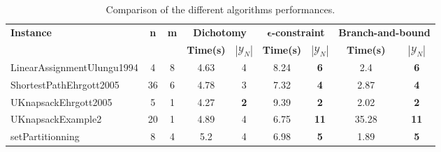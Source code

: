 \begin{table}[!h]
\centering
\hspace*{-1cm}\begin{tabular}{lcccccccc}
\toprule
\textbf{Instance} & \textbf{n} & \textbf{m} & \multicolumn{2}{c}{\textbf{Dichotomy}} & \multicolumn{2}{c}{\textbf{$\mathbf{\epsilon}$-constraint}}  & \multicolumn{2}{c}{\textbf{Branch-and-bound}}
\\
\cmidrule(r){4-5} \cmidrule(r){6-7} \cmidrule(r){8-9}
~ & ~ & ~ & \textbf{Time(s)} & \textbf{$|\mathcal{Y}_N|$} & \textbf{Time(s)} & \textbf{$|\mathcal{Y}_N|$} & \textbf{Time(s)} & \textbf{$|\mathcal{Y}_N|$} \\
\midrule

LinearAssignmentUlungu1994 & 4 & 8 & 4.63 & 4 & 8.24 &  \textbf{6} &  \textcolor{blue2}{2.4} &  \textbf{6} \\
ShortestPathEhrgott2005 & 36 & 6 & 4.78 & 3 & 7.32 &  \textbf{4} &  \textcolor{blue2}{2.87} &  \textbf{4} \\
UKnapsackEhrgott2005 & 5 & 1 & 4.27 &  \textbf{2} & 9.39 &  \textbf{2} &  \textcolor{blue2}{2.02} &  \textbf{2} \\
UKnapsackExample2 & 20 & 1 &  \textcolor{blue2}{4.89} & 4 & 6.75 &  \textbf{11} & 35.28 &  \textbf{11} \\
setPartitionning & 8 & 4 & 5.2 & 4 & 6.98 &  \textbf{5} &  \textcolor{blue2}{1.89} &  \textbf{5} \\
\bottomrule
\end{tabular}
\caption{Comparison of the different algorithms performances.}
\label{tab:table_compare}
\end{table}


